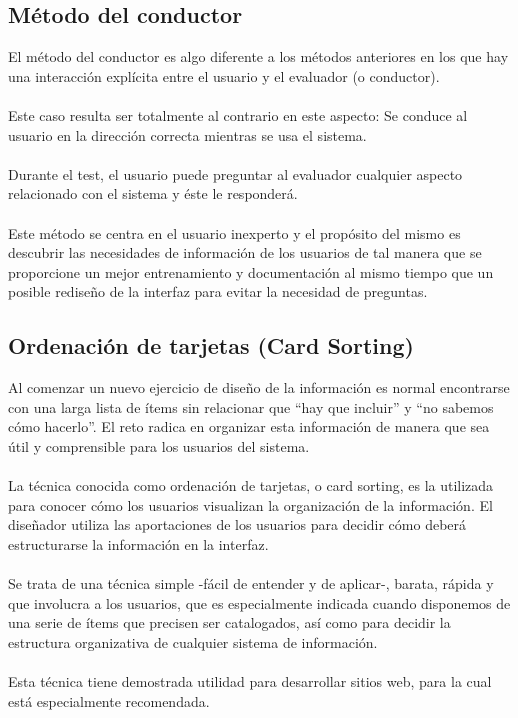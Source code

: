 \subsection{Método del conductor}
El método del conductor es algo diferente a los métodos anteriores en los que hay una interacción explícita entre el usuario y el evaluador (o conductor). \\ \\
Este caso resulta ser totalmente al contrario en este aspecto: Se conduce al usuario en la dirección correcta mientras se usa el sistema. \\ \\
Durante el test, el usuario puede preguntar al evaluador cualquier aspecto relacionado con el sistema y éste le responderá. \\ \\
Este método se centra en el usuario inexperto y el propósito del mismo es descubrir las necesidades de información de los usuarios de tal manera que se proporcione un mejor entrenamiento y documentación al mismo tiempo que un posible rediseño de la interfaz para evitar la necesidad de preguntas.

\subsection{Ordenación de tarjetas (Card Sorting)}
Al comenzar un nuevo ejercicio de diseño de la información es normal encontrarse con una larga lista de ítems sin relacionar que “hay que incluir” y “no sabemos cómo hacerlo”. El reto radica en organizar esta información de manera que sea útil y comprensible para los usuarios del sistema. \\ \\
La técnica conocida como ordenación de tarjetas, o card sorting, es la utilizada para conocer cómo los usuarios visualizan la organización de la información. El diseñador utiliza las aportaciones de los usuarios para decidir cómo deberá estructurarse la información en la interfaz. \\ \\
Se trata de una técnica simple -fácil de entender y de aplicar-, barata, rápida y que involucra a los usuarios, que es especialmente indicada cuando disponemos de una serie de ítems que precisen ser catalogados, así como para decidir la estructura organizativa de cualquier sistema de información. \\ \\
Esta técnica tiene demostrada utilidad para desarrollar sitios web, para la cual está especialmente recomendada.
